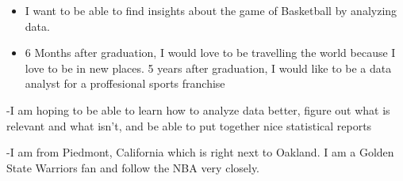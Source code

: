\documentclass[]{article}
\begin{document}
\begin{itemize}
\item
  I want to be able to find insights about the game of Basketball by
  analyzing data.
\item
  6 Months after graduation, I would love to be travelling the world
  because I love to be in new places. 5 years after graduation, I would
  like to be a data analyst for a proffesional sports franchise
\end{itemize}

-I am hoping to be able to learn how to analyze data better, figure out
what is relevant and what isn't, and be able to put together nice
statistical reports

-I am from Piedmont, California which is right next to Oakland. I am a
Golden State Warriors fan and follow the NBA very closely.
\end{document}
